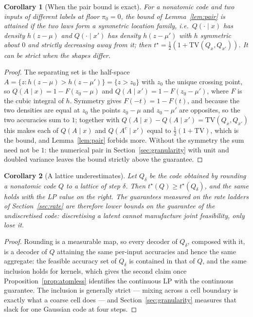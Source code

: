 \documentclass[11pt]{article}
\newtheorem{corollary}{Corollary}
\begin{document}
\begin{corollary}[When the pair bound is exact]\label{cor:pairtight}
For a nonatomic code and two inputs of different labels at floor $\pi_0=0$, the bound of
Lemma~\ref{lem:pair} is attained if the two laws form a symmetric location family, i.e.\
$Q(\cdot\mid x)$ has density $h(z-\mu)$ and $Q(\cdot\mid x')$ has density $h(z-\mu')$ with $h$
symmetric about $0$ and strictly decreasing away from it; then
$t^\star=\tfrac12(1+\mathrm{TV}(Q_x,Q_{x'}))$. It can be strict when the shapes differ.
\end{corollary}
\begin{proof}
The separating set is the half-space $A=\{z:h(z-\mu)>h(z-\mu')\}=\{z>z_0\}$ with $z_0$ the unique
crossing point, so $Q(A\mid x)=1-F(z_0-\mu)$ and $Q(A\mid x')=1-F(z_0-\mu')$, where $F$ is the
cubic integral of $h$. Symmetry gives $F(-t)=1-F(t)$, and because the two densities are equal at
$z_0$ the points $z_0-\mu$ and $z_0-\mu'$ are opposites, so the two accuracies sum to $1$; together
with $Q(A\mid x)-Q(A\mid x')=\mathrm{TV}(Q_x,Q_{x'})$ this makes each of $Q(A\mid x)$ and
$Q(A^c\mid x')$ equal to $\tfrac12(1+\mathrm{TV})$, which is the bound, and Lemma~\ref{lem:pair}
forbids more. Without the symmetry the sum need not be $1$: the numerical pair in
Section~\ref{sec:granularity} with unit and doubled variance leaves the bound strictly above the
guarantee.
\end{proof}

\begin{corollary}[A lattice underestimates]\label{cor:conservative}
Let $Q_\delta$ be the code obtained by rounding a nonatomic code $Q$ to a lattice of step $\delta$.
Then $t^\star(Q)\ge t^\star(Q_\delta)$, and the same holds with the LP value on the right. The
guarantees measured on the rate ladders of Section~\ref{sec:rate} are therefore lower bounds on the
guarantee of the undiscretised code: discretising a latent cannot manufacture joint feasibility,
only lose it.
\end{corollary}
\begin{proof}
Rounding is a measurable map, so every decoder of $Q_\delta$, composed with it, is a decoder of $Q$
attaining the same per-input accuracies and hence the same aggregate: the feasible accuracy set of
$Q_\delta$ is contained in that of $Q$, and the same inclusion holds for kernels, which gives the
second claim once Proposition~\ref{prop:atomless} identifies the continuous LP with the continuous
guarantee. The inclusion is generally strict --- mixing across a cell boundary is exactly what a
coarse cell does --- and Section~\ref{sec:granularity} measures that slack for one Gaussian code at
four steps.
\end{proof}
\end{document}
